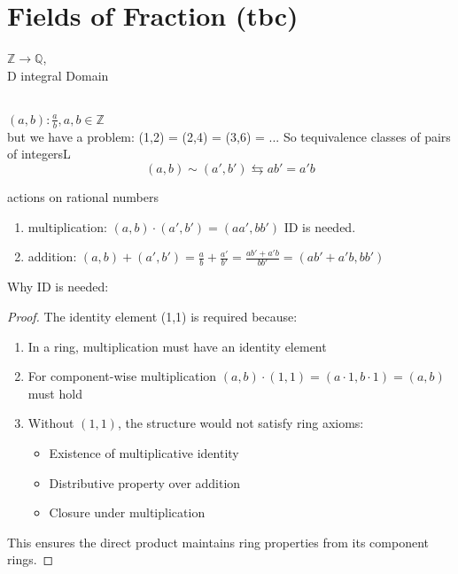 \documentclass{article}
\begin{document}
\section{Fields of Fraction (tbc)}
$\mathbb{Z} \to \mathbb{Q}$, \\ D integral Domain 

\begin{definition}[rational]
     \leavevmode \\ 
     $(a,b): \frac{a}{b},  a, b \in \mathbb{Z} $
     \\ but we have a problem: (1,2) = (2,4) = (3,6) = ... 
     So tequivalence classes of pairs of integersL 
     $$(a,b) \sim (a', b') \leftrightarrows ab' = a'b$$ 
\end{definition}
actions on rational numbers
\begin{enumerate}
    \item multiplication: $(a,b) \cdot (a', b' ) = (aa', bb')$ ID is needed. 
    \item addition: $(a,b) + (a', b') = \frac{a}{b} + \frac{a'}{b'} =\frac{ab' + a'b}{bb'} = (ab' + a'b, bb')$
\end{enumerate}
Why ID is needed: 
\begin{proof}
    The identity element (1,1) is required because:
    
    \begin{enumerate}
       \item In a ring, multiplication must have an identity element
       \item For component-wise multiplication $(a,b) \cdot (1,1) = (a \cdot 1, b \cdot 1) = (a,b)$ must hold
       \item Without $(1,1)$, the structure would not satisfy ring axioms:
       \begin{itemize}
           \item Existence of multiplicative identity
           \item Distributive property over addition 
           \item Closure under multiplication
       \end{itemize}
    \end{enumerate}
    
    This ensures the direct product maintains ring properties from its component rings.
    \end{proof}
\end{document}
